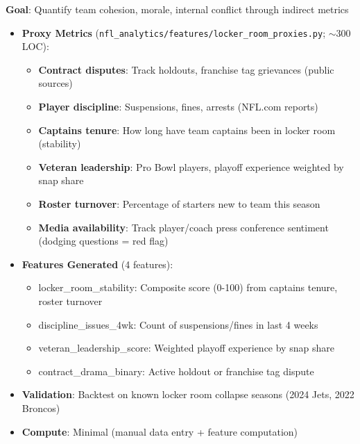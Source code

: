 \textbf{Goal}: Quantify team cohesion, morale, internal conflict through indirect metrics

\begin{itemize}
  \item {} \textbf{Proxy Metrics} (\texttt{nfl\_analytics/features/locker\_room\_proxies.py}; $\sim$300 LOC):
  \begin{itemize}
    \item \textbf{Contract disputes}: Track holdouts, franchise tag grievances (public sources)
    \item \textbf{Player discipline}: Suspensions, fines, arrests (NFL.com reports)
    \item \textbf{Captains tenure}: How long have team captains been in locker room (stability)
    \item \textbf{Veteran leadership}: Pro Bowl players, playoff experience weighted by snap share
    \item \textbf{Roster turnover}: Percentage of starters new to team this season
    \item \textbf{Media availability}: Track player/coach press conference sentiment (dodging questions = red flag)
  \end{itemize}
  \item {} \textbf{Features Generated} (4 features):
  \begin{itemize}
    \item locker\_room\_stability: Composite score (0-100) from captains tenure, roster turnover
    \item discipline\_issues\_4wk: Count of suspensions/fines in last 4 weeks
    \item veteran\_leadership\_score: Weighted playoff experience by snap share
    \item contract\_drama\_binary: Active holdout or franchise tag dispute
  \end{itemize}
  \item {} \textbf{Validation}: Backtest on known locker room collapse seasons (2024 Jets, 2022 Broncos)
  \item \textbf{Compute}: Minimal (manual data entry + feature computation)
\end{itemize}

